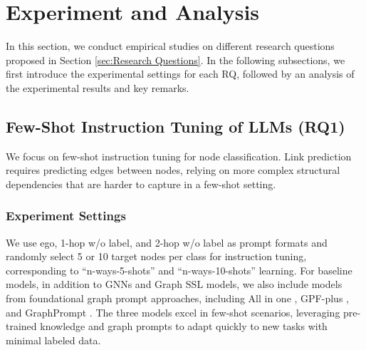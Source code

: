 
\section{Experiment and  Analysis}
\label{sec:Empirical Studies}
In this section, we conduct empirical studies on different research questions proposed in Section \ref{sec:Research Questions}. 
In the following subsections, we first introduce the experimental settings for each RQ, followed by an analysis of the experimental results and key remarks.





\subsection{Few-Shot Instruction Tuning of LLMs (RQ1)}
\label{sec:Case 2}
We focus on few-shot instruction tuning for node classification. Link prediction requires predicting edges between nodes, relying on more complex structural dependencies that are harder to capture in a few-shot setting.
\subsubsection{Experiment Settings}
We use ego, 1-hop w/o label, and 2-hop w/o label as prompt formats and randomly select 5 or 10 target nodes per class for instruction tuning, corresponding to “n-ways-5-shots” and “n-ways-10-shots” learning. 
For baseline models, in addition to GNNs and Graph SSL models, we also include models from foundational graph prompt approaches, including All in one \cite{sun2023allinone}, GPF-plus \cite{gpf-plus}, and GraphPrompt \cite{liu2023graphprompt}. The three models excel in few-shot scenarios, leveraging pre-trained knowledge and graph prompts to adapt quickly to new tasks with minimal labeled data.



